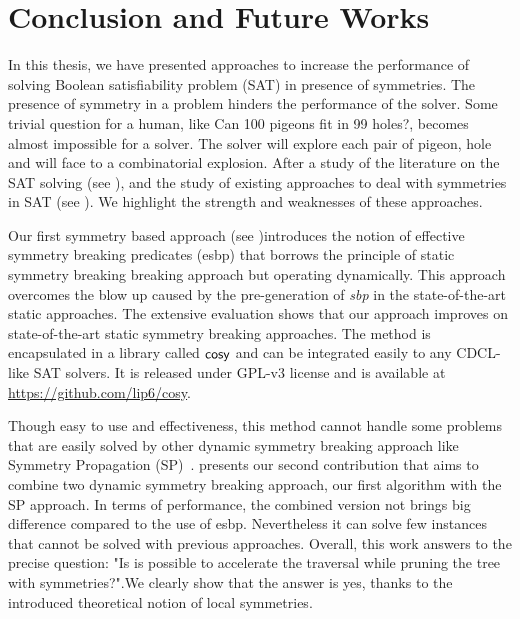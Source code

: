 \chapter{Conclusion and Future Works}\label{chap:conclu}



In this thesis, we have presented approaches to increase the performance of solving 
Boolean satisfiability problem (SAT) in presence of symmetries. 
The presence of symmetry in a problem hinders the performance of the solver.
Some trivial question for a human, like Can 100 pigeons fit in 99 holes?,
becomes almost impossible for a solver. The solver will explore each pair of pigeon, hole and 
will face to a combinatorial explosion.
After a study of the literature on the SAT solving (see ), and the study of existing 
approaches to deal with symmetries in SAT (see ). We highlight the strength and weaknesses of these approaches. 
%
%

Our first symmetry based approach (see )introduces the notion of effective symmetry breaking predicates (esbp)
that borrows the principle of static symmetry breaking breaking approach but operating dynamically\cite{metin2018cdclsym}.
This approach overcomes the blow up caused by the pre-generation of \textit{sbp} in the state-of-the-art 
static approaches. The extensive evaluation shows that our approach improves on state-of-the-art static 
symmetry breaking approaches.
The method is encapsulated in a library called $\textsf{cosy}$ and can be integrated easily to any
CDCL-like SAT solvers. It is released under GPL-v3 license and is available at \url{https://github.com/lip6/cosy}.

Though easy to use and effectiveness, this method cannot handle some problems that are easily solved by other
dynamic symmetry breaking approach like Symmetry Propagation (SP)~\cite{Devriendt12}.
 presents our second contribution that aims to combine two dynamic symmetry breaking approach, our first algorithm  with the SP approach. In terms of performance, the combined version not brings big difference
compared to the use of esbp. Nevertheless it can solve few instances that cannot be solved with previous approaches.
Overall,  this  work  answers  to  the  precise  question: "Is is possible to accelerate the traversal while pruning the tree
with symmetries?".We clearly show that the answer is yes, thanks to the introduced theoretical notion of local symmetries.


